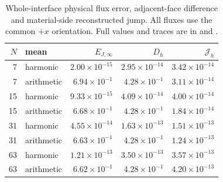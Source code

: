 \begin{table}[htbp]
\centering
\small
\setlength{\tabcolsep}{4pt}
\begin{tabular}{rlrrr}
\toprule
$N$ & mean & $E_{J,\infty}$ & $D_h$ & $\mathcal J_h$ \\
\midrule
7 & harmonic & $2.00\times10^{-15}$ & $2.95\times10^{-14}$ & $3.42\times10^{-14}$ \\
7 & arithmetic & $6.94\times10^{-1}$ & $4.28\times10^{-1}$ & $3.11\times10^{-14}$ \\
15 & harmonic & $9.33\times10^{-15}$ & $4.09\times10^{-14}$ & $4.00\times10^{-14}$ \\
15 & arithmetic & $6.68\times10^{-1}$ & $4.28\times10^{-1}$ & $1.84\times10^{-14}$ \\
31 & harmonic & $4.55\times10^{-14}$ & $1.63\times10^{-13}$ & $1.51\times10^{-13}$ \\
31 & arithmetic & $6.63\times10^{-1}$ & $4.28\times10^{-1}$ & $1.24\times10^{-13}$ \\
63 & harmonic & $1.21\times10^{-13}$ & $3.50\times10^{-13}$ & $3.57\times10^{-13}$ \\
63 & arithmetic & $6.62\times10^{-1}$ & $4.28\times10^{-1}$ & $4.20\times10^{-13}$ \\
\bottomrule
\end{tabular}
\caption{Whole-interface physical flux error, adjacent-face difference and material-side reconstructed jump. All fluxes use the common $+x$ orientation. Full values and traces are in  and .}
\label{tab:variable-interface}
\end{table}
